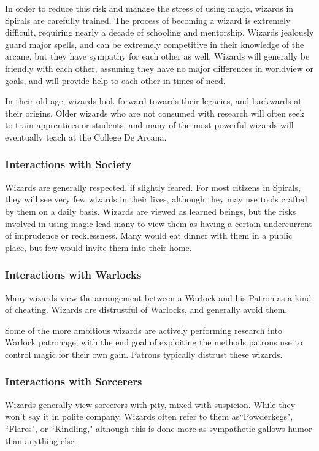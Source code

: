 \begin{multicols}{2}
In order to reduce this risk and manage the stress of using magic, wizards in Spirals are carefully trained.
The process of becoming a wizard is extremely difficult, requiring nearly a decade of schooling and mentorship.
Wizards jealously guard major spells, and can be extremely competitive in their knowledge of the arcane, but they have sympathy for each other as well.
Wizards will generally be friendly with each other, assuming they have no major differences in worldview or goals, and will provide help to each other in times of need.

In their old age, wizards look forward towards their legacies, and backwards at their origins.
Older wizards who are not consumed with research will often seek to train apprentices or students, and many of the most powerful wizards will eventually teach at the College De Arcana.

\subsubsection{Interactions with Society}
Wizards are generally respected, if slightly feared.
For most citizens in Spirals, they will see very few wizards in their lives, although they may use tools crafted by them on a daily basis.
Wizards are viewed as learned beings, but the risks involved in using magic lead many to view them as having a certain undercurrent of imprudence or recklessness.
Many would eat dinner with them in a public place, but few would invite them into their home.

\subsubsection{Interactions with Warlocks}
Many wizards view the arrangement between a Warlock and his Patron as a kind of cheating.
Wizards are distrustful of Warlocks, and generally avoid them.

Some of the more ambitious wizards are actively performing research into Warlock patronage, with the end goal of exploiting the methods patrons use to control magic for their own gain.
Patrons typically distrust these wizards.

\subsubsection{Interactions with Sorcerers}
Wizards generally view sorcerers with pity, mixed with suspicion.
While they won't say it in polite company, Wizards often refer to them as``Powderkegs", ``Flares", or ``Kindling," although this is done more as sympathetic gallows humor than anything else.


\end{multicols}
